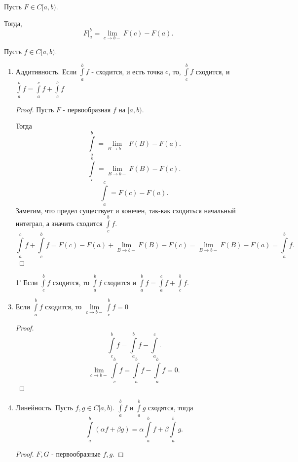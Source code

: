 \begin{definition} \thmslashn 

    Пусть $F\in C[a, b)$.

    Тогда, 
    \[ \left. F\right|_{a}^{b} = \lim\limits_{c \to b-} F(c) - F(a) .\] 
\end{definition}
\begin{properties} \thmslashn

    Пусть $f\in C[a, b)$.

    \begin{enumerate}
        \item Аддитивность. Если $\int\limits_{a}^{b} f $ - сходится, и есть точка $c$, то, $\int\limits_{c}^{b} f$ сходится, и $\int\limits_{a}^{b} f = \int\limits_{a}^{c} f + \int\limits_{c}^{b} f   $
            \begin{proof}
                Пусть $F$ - первообразная $f$ на $[a, b)$.

                Тогда
                \[ \int\limits_{a}^{b} = \lim\limits_{B \to b-} F(B) - F(a)  .\]
                \[ \int\limits_{c}^{b} = \lim\limits_{B \to b-} F(B) - F(c)  .\]
                \[ \int\limits_{a}^{c} = F(c) - F(a)  .\]
                Заметим, что предел существует и конечен, так-как сходиться начальный интеграл, а значить сходится $\int\limits_{c}^{b}  f$.
                \[ \int\limits_{a}^{c} f + \int\limits_{c}^{b} f = F(c) - F(a) + \lim\limits_{B \to b-} F(B) - F(c) = \lim\limits_{B \to b-} F(B) - F(a) = \int\limits_{a}^{b} f    .\] 
            \end{proof}
        \item[1'] Если $\int\limits_{c}^{b} f $ сходится, то $\int\limits_{a}^{b} f $ сходится и $\int\limits_{a}^{b} f = \int\limits_{a}^{c} f + \int\limits_{c}^{b} f  $.
        \item Если $\int\limits_{a}^{b} f $ сходится, то $\lim\limits_{c \to b-} \int\limits_{c}^{b} f = 0 $
            \begin{proof}
               \[ \int\limits_{c}^{b} f = \int\limits_{a}^{b} f - \int\limits_{a}^{c}     .\]
               \[ \lim\limits_{c \to b-} \int\limits_{c}^{b} f = \int\limits_{a}^{b} f - \int\limits_{a}^{b} f = 0    .\] 
            \end{proof}
        \item Линейность. Пусть $f, g\in C[a, b)$. $\int\limits_{a}^{b} f $ и $\int\limits_{a}^{b} g $ сходятся, тогда
            \[ \int\limits_{a}^{b} \left( \alpha f + \beta g \right) = \alpha \int\limits_{a}^{b} f + \beta \int\limits_{a}^{b} g    .\]
            \begin{proof}
                $F, G$ - первообразные $f, g$.


\end{proof}
\end{enumerate}
\end{properties}

